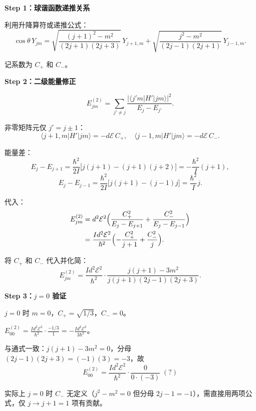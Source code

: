 \begin{derivationbox}
\textbf{Step 1：球谐函数递推关系}

利用升降算符或递推公式：
\[
\cos\theta\,Y_{jm}=\sqrt{\frac{(j+1)^2-m^2}{(2j+1)(2j+3)}}\,Y_{j+1,m}
+\sqrt{\frac{j^2-m^2}{(2j-1)(2j+1)}}\,Y_{j-1,m}.
\]

记系数为 $C_+$ 和 $C_-$。

\textbf{Step 2：二级能量修正}

\[
E_{jm}^{(2)}=\sum_{j'\neq j}\frac{|\langle j'm|H'|jm\rangle|^2}{E_j-E_{j'}}.
\]

非零矩阵元仅 $j'=j\pm1$：
\[
\langle j+1,m|H'|jm\rangle=-d\mathcal{E}\,C_+,\quad
\langle j-1,m|H'|jm\rangle=-d\mathcal{E}\,C_-.
\]

能量差：
\[
E_j-E_{j+1}=\frac{\hbar^2}{2I}\bigl[j(j+1)-(j+1)(j+2)\bigr]=-\frac{\hbar^2}{I}(j+1),
\]
\[
E_j-E_{j-1}=\frac{\hbar^2}{2I}\bigl[j(j+1)-(j-1)j\bigr]=\frac{\hbar^2}{I}j.
\]

代入：
\begin{align*}
E_{jm}^{(2)}&=d^2\mathcal{E}^2\Bigl(\frac{C_+^2}{E_j-E_{j+1}}+\frac{C_-^2}{E_j-E_{j-1}}\Bigr)\\
&=\frac{Id^2\mathcal{E}^2}{\hbar^2}\Bigl(-\frac{C_+^2}{j+1}+\frac{C_-^2}{j}\Bigr).
\end{align*}

将 $C_+$ 和 $C_-$ 代入并化简：
\[
E_{jm}^{(2)}=\frac{Id^2\mathcal{E}^2}{\hbar^2}\cdot\frac{j(j+1)-3m^2}{j(j+1)(2j-1)(2j+3)}.
\]

\textbf{Step 3：$j=0$ 验证}

$j=0$ 时 $m=0$，$C_+=\sqrt{1/3}$，$C_-=0$。

$E_{00}^{(2)}=\frac{Id^2\mathcal{E}^2}{\hbar^2}\cdot\frac{-1/3}{1}=-\frac{Id^2\mathcal{E}^2}{3\hbar^2}$。

与通式一致：$j(j+1)-3m^2=0$，分母 $(2j-1)(2j+3)=(-1)(3)=-3$，故
\[
E_{00}^{(2)}=\frac{Id^2\mathcal{E}^2}{\hbar^2}\cdot\frac{0}{0\cdot(-3)}\;(?)
\]

实际上 $j=0$ 时 $C_-$ 无定义（$j^2-m^2=0$ 但分母 $2j-1=-1$），需直接用两项公式，仅 $j\to j+1=1$ 项有贡献。
\end{derivationbox}

\vspace{1em}
